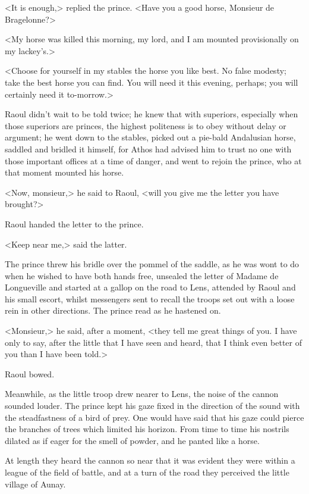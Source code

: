 <It is enough,> replied the prince. <Have you a good horse, Monsieur de Bragelonne?>

<My horse was killed this morning, my lord, and I am mounted provisionally on my lackey's.>

<Choose for yourself in my stables the horse you like best. No false modesty; take the best horse you can find. You will need it this evening, perhaps; you will certainly need it to-morrow.>

Raoul didn't wait to be told twice; he knew that with superiors, especially when those superiors are princes, the highest politeness is to obey without delay or argument; he went down to the stables, picked out a pie-bald Andalusian horse, saddled and bridled it himself, for Athos had advised him to trust no one with those important offices at a time of danger, and went to rejoin the prince, who at that moment mounted his horse.

<Now, monsieur,> he said to Raoul, <will you give me the letter you have brought?>

Raoul handed the letter to the prince.

<Keep near me,> said the latter.

The prince threw his bridle over the pommel of the saddle, as he was wont to do when he wished to have both hands free, unsealed the letter of Madame de Longueville and started at a gallop on the road to Lens, attended by Raoul and his small escort, whilst messengers sent to recall the troops set out with a loose rein in other directions. The prince read as he hastened on.

<Monsieur,> he said, after a moment, <they tell me great things of you. I have only to say, after the little that I have seen and heard, that I think even better of you than I have been told.>

Raoul bowed.

Meanwhile, as the little troop drew nearer to Lens, the noise of the cannon sounded louder. The prince kept his gaze fixed in the direction of the sound with the steadfastness of a bird of prey. One would have said that his gaze could pierce the branches of trees which limited his horizon. From time to time his nostrils dilated as if eager for the smell of powder, and he panted like a horse.

At length they heard the cannon so near that it was evident they were within a league of the field of battle, and at a turn of the road they perceived the little village of Aunay.


